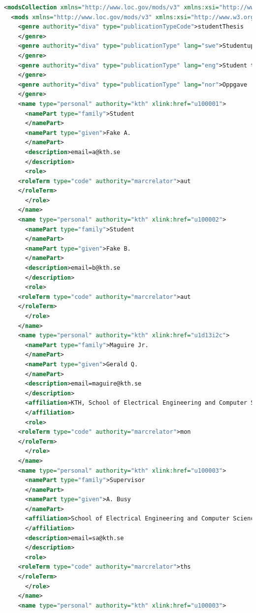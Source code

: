 \begin{lstlisting}[language={XML}, caption={test12.mods (reformatted in EMACS using XML mode)}, label=lst:test12.mods]
<modsCollection xmlns="http://www.loc.gov/mods/v3" xmlns:xsi="http://www.w3.org/2001/XMLSchema-instance" xsi:schemaLocation="http://www.loc.gov/mods/v3 http://www.loc.gov/standards/mods/v3/mods-3-2.xsd">
  <mods xmlns="http://www.loc.gov/mods/v3" xmlns:xsi="http://www.w3.org/2001/XMLSchema-instance" xmlns:xlink="http://www.w3.org/1999/xlink" version="3.2" xsi:schemaLocation="http://www.loc.gov/mods/v3 http://www.loc.gov/standards/mods/v3/mods-3-2.xsd">
    <genre authority="diva" type="publicationTypeCode">studentThesis
    </genre>
    <genre authority="diva" type="publicationType" lang="swe">Studentuppsats (Examensarbete)
    </genre>
    <genre authority="diva" type="publicationType" lang="eng">Student thesis
    </genre>
    <genre authority="diva" type="publicationType" lang="nor">Oppgave
    </genre>
    <name type="personal" authority="kth" xlink:href="u100001">
      <namePart type="family">Student
      </namePart>
      <namePart type="given">Fake A.
      </namePart>
      <description>email=a@kth.se
      </description>
      <role>
	<roleTerm type="code" authority="marcrelator">aut
	</roleTerm>
      </role>
    </name>
    <name type="personal" authority="kth" xlink:href="u100002">
      <namePart type="family">Student
      </namePart>
      <namePart type="given">Fake B.
      </namePart>
      <description>email=b@kth.se
      </description>
      <role>
	<roleTerm type="code" authority="marcrelator">aut
	</roleTerm>
      </role>
    </name>
    <name type="personal" authority="kth" xlink:href="u1d13i2c">
      <namePart type="family">Maguire Jr.
      </namePart>
      <namePart type="given">Gerald Q.
      </namePart>
      <description>email=maguire@kth.se
      </description>
      <affiliation>KTH, School of Electrical Engineering and Computer Science, Computer Science
      </affiliation>
      <role>
	<roleTerm type="code" authority="marcrelator">mon
	</roleTerm>
      </role>
    </name>
    <name type="personal" authority="kth" xlink:href="u100003">
      <namePart type="family">Supervisor
      </namePart>
      <namePart type="given">A. Busy
      </namePart>
      <affiliation>School of Electrical Engineering and Computer Science, Computer Science
      </affiliation>
      <description>email=sa@kth.se
      </description>
      <role>
	<roleTerm type="code" authority="marcrelator">ths
	</roleTerm>
      </role>
    </name>
    <name type="personal" authority="kth" xlink:href="u100003">

\end{lstlisting}
